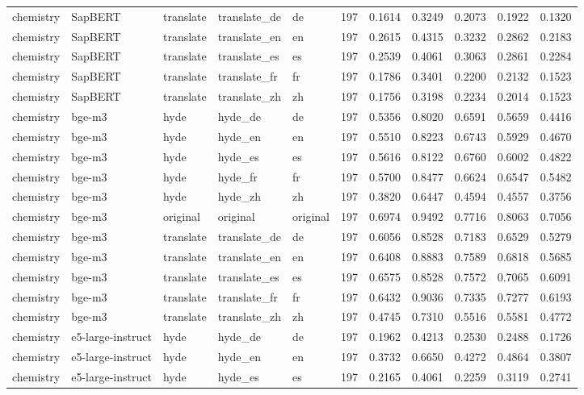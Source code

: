 \begin{tabular}{lllllrrrrrr}
chemistry & SapBERT & translate & translate\_de & de & 197 & 0.1614 & 0.3249 & 0.2073 & 0.1922 & 0.1320 \\
chemistry & SapBERT & translate & translate\_en & en & 197 & 0.2615 & 0.4315 & 0.3232 & 0.2862 & 0.2183 \\
chemistry & SapBERT & translate & translate\_es & es & 197 & 0.2539 & 0.4061 & 0.3063 & 0.2861 & 0.2284 \\
chemistry & SapBERT & translate & translate\_fr & fr & 197 & 0.1786 & 0.3401 & 0.2200 & 0.2132 & 0.1523 \\
chemistry & SapBERT & translate & translate\_zh & zh & 197 & 0.1756 & 0.3198 & 0.2234 & 0.2014 & 0.1523 \\
chemistry & bge-m3 & hyde & hyde\_de & de & 197 & 0.5356 & 0.8020 & 0.6591 & 0.5659 & 0.4416 \\
chemistry & bge-m3 & hyde & hyde\_en & en & 197 & 0.5510 & 0.8223 & 0.6743 & 0.5929 & 0.4670 \\
chemistry & bge-m3 & hyde & hyde\_es & es & 197 & 0.5616 & 0.8122 & 0.6760 & 0.6002 & 0.4822 \\
chemistry & bge-m3 & hyde & hyde\_fr & fr & 197 & 0.5700 & 0.8477 & 0.6624 & 0.6547 & 0.5482 \\
chemistry & bge-m3 & hyde & hyde\_zh & zh & 197 & 0.3820 & 0.6447 & 0.4594 & 0.4557 & 0.3756 \\
chemistry & bge-m3 & original & original & original & 197 & 0.6974 & 0.9492 & 0.7716 & 0.8063 & 0.7056 \\
chemistry & bge-m3 & translate & translate\_de & de & 197 & 0.6056 & 0.8528 & 0.7183 & 0.6529 & 0.5279 \\
chemistry & bge-m3 & translate & translate\_en & en & 197 & 0.6408 & 0.8883 & 0.7589 & 0.6818 & 0.5685 \\
chemistry & bge-m3 & translate & translate\_es & es & 197 & 0.6575 & 0.8528 & 0.7572 & 0.7065 & 0.6091 \\
chemistry & bge-m3 & translate & translate\_fr & fr & 197 & 0.6432 & 0.9036 & 0.7335 & 0.7277 & 0.6193 \\
chemistry & bge-m3 & translate & translate\_zh & zh & 197 & 0.4745 & 0.7310 & 0.5516 & 0.5581 & 0.4772 \\
chemistry & e5-large-instruct & hyde & hyde\_de & de & 197 & 0.1962 & 0.4213 & 0.2530 & 0.2488 & 0.1726 \\
chemistry & e5-large-instruct & hyde & hyde\_en & en & 197 & 0.3732 & 0.6650 & 0.4272 & 0.4864 & 0.3807 \\
chemistry & e5-large-instruct & hyde & hyde\_es & es & 197 & 0.2165 & 0.4061 & 0.2259 & 0.3119 & 0.2741 \\

\end{tabular}
